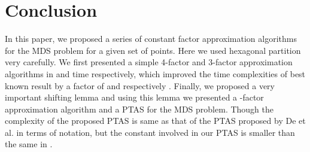 \documentclass[a4paper,11pt]{article}
\begin{document}
\section{Conclusion}
In this paper, we proposed a series of constant factor approximation algorithms for the MDS 
problem for a given set  of  points. Here we used hexagonal partition very carefully.
We first presented a simple 4-factor and 3-factor approximation algorithms in  
and  time respectively, which improved the time complexities of best known 
result by a factor of  and  respectively \cite{DDCN13}. Finally, we proposed a 
very important shifting lemma and using this lemma we presented a -factor approximation 
algorithm and a PTAS for the MDS problem. Though the complexity of the proposed PTAS is same as that 
of the PTAS proposed by De et al. \cite{DDCN13} in terms of  notation, but the constant involved 
in our PTAS is smaller than the same in \cite{DDCN13}.
\end{document}
